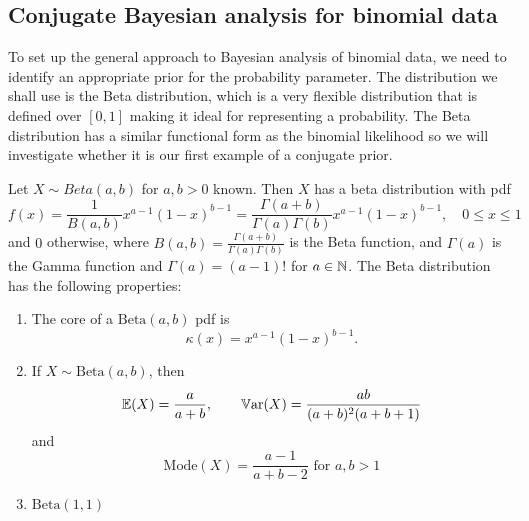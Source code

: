 \documentclass[10pt, a4paper]{article}
\begin{document}
\subsection{Conjugate Bayesian analysis for binomial data}
To set up the general approach to Bayesian analysis of binomial data,
we need to identify an appropriate prior for the probability parameter.
The distribution we shall use is the Beta distribution,
which is a very flexible distribution that is defined over $[0, 1]$ making it ideal for representing a probability.
The Beta distribution has a similar functional form as the binomial likelihood so we will investigate whether it is our first example of a conjugate prior.

\begin{definition}
    Let $X \sim Beta(a, b)$ for $a, b > 0$ known.
    Then $X$ has a beta distribution with pdf
    \[
    f(x) = \frac{1}{B(a, b)}x ^ {a - 1}(1 - x) ^ {b - 1} = \frac{\Gamma(a + b)}{\Gamma(a)\Gamma(b)}x ^ {a - 1}(1 - x) ^ {b - 1}, \quad 0 \leq x \leq 1
    \]
    and $0$ otherwise,
    where $B(a, b) = \frac{\Gamma(a + b)}{\Gamma(a)\Gamma(b)}$ is the Beta function,
    and $\Gamma(a)$ is the Gamma function and $\Gamma(a) = (a - 1)!$ for $a \in \mathbb{N}$.
    The Beta distribution has the following properties:
    \begin{enumerate}[label = \arabic*.]
        \item The core of a $\mathrm{Beta}(a, b)$ pdf is
        \[
        \kappa(x) = x ^ {a - 1}(1 - x) ^ {b - 1}.
        \]

        \item If $X \sim \mathrm{Beta}(a, b)$,
        then
        \[
        \mathbb{E}(X) = \frac{a}{a + b},\qquad\mathbb{V}\mathrm{ar}(X) = \frac{ab}{(a + b) ^ 2(a + b + 1)}
        \]
        and
        \[
        \mathrm{Mode}(X) = \frac{a - 1}{a + b - 2}\text{ for } a, b > 1
        \]

        \item $\mathrm{Beta}(1, 1)$
    \end{enumerate}
\end{definition}
\end{document}
